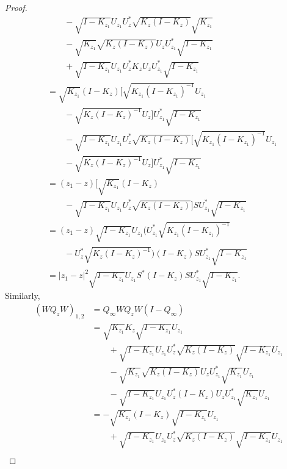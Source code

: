 \documentclass{amsart}
\begin{document}
\begin{proof}
\begin{equation}
\begin{split}
                    & \qquad - \sqrt{I - K_{z_1}}U_{z_1}U^{*}_{z}\sqrt{K_{z} (I - K_{z})}\sqrt{K_{z_1}} \\
                    & \qquad - \sqrt{K_{z_1}}\sqrt{K_{z}(I-K_{z})}U_{z}U^{*}_{z_1}\sqrt{I-K_{z_1}} \\
                    & \qquad + \sqrt{I-K_{z_1}}U_{z_1}U^{*}_{z}K_{z}U_{z}U^{*}_{z_1}\sqrt{I - K_{z_1}}\\
                    &= \sqrt{K_{z_1}}(I-K_z)[\sqrt{K_{z_1}(I-K_{z_1})^{-1}}U_{z_1} \\
                    & \qquad - \sqrt{K_z(I - K_z)^{-1}}U_z]U_{z_1}^{*}\sqrt{I-K_{z_1}} \\
                    & \qquad- \sqrt{I-K_{z_1}}U_{z_1}U_{z}^{*}\sqrt{K_{z}(I- K_z)}[\sqrt{K_{z_1}(I-K_{z_1})^{-1}}U_{z_1}\\
                    & \qquad  - \sqrt{K_z(I - K_z)^{-1}}U_z]U^{*}_{z_1}\sqrt{I-K_{z_1}}\\
                    & = (z_1 - z)[\sqrt{K_{z_1}}(I-K_z)\\
                    & \qquad -\sqrt{I - K_{z_1}}U_{z_1}U^{*}_{z}\sqrt{K_{z}(I-K_z)}]SU_{z_1}^{*}\sqrt{I-K_{z_1}}\\
                    &= (z_1 - z)\sqrt{I-K_{z_1}}U_{z_1}(U^{*}_{z_1}\sqrt{K_{z_1}(I-K_{z_1})^{-1}}\\
                    & \qquad  - U^{*}_{z}\sqrt{K_z(I-K_z)^{-1}})(I-K_z)SU^{*}_{z_1}\sqrt{I-K_{z_1}}\\
                    &= |z_1 - z|^{2}\sqrt{I-K_{z_1}}U_{z_1}S^{*}(I-K_z)SU_{z_1}^{*}\sqrt{I-K_{z_1}}.
\end{split}
\end{equation}
Similarly,
\begin{align*}\label{eq6}
(WQ_{z}W)_{1,2} &= Q_{\infty}WQ_{z}W(I - Q_{\infty}) \\   
                &= \sqrt{K_{z_1}}K_{z}\sqrt{I - K_{z_1}}U_{z_1} \\
                & \qquad + \sqrt{I - K_{z_1}}U_{z_1}U^{*}_{z}\sqrt{K_{z} (I - K_{z})}\sqrt{I - K_{z_1}}U_{z_1} \\
                & \qquad -\sqrt{K_{z_1}}\sqrt{K_{z}(I-K_{z})}U_{z}U^{*}_{z_1}\sqrt{K_{z_1}}U_{z_1}\\
                & \qquad  - \sqrt{I-K_{z_1}}U_{z_1}U^{*}_{z}(I - K_z)U_{z}U^{*}_{z_1}\sqrt{K_{z_1}}U_{z_1}\\
                &= -\sqrt{K_{z_1}}(I-K_{z})\sqrt{I - K_{z_1}}U_{z_1} \\
                & \qquad + \sqrt{I - K_{z_1}}U_{z_1}U^{*}_{z}\sqrt{K_{z} (I - K_{z})}\sqrt{I - K_{z_1}}U_{z_1} \\

\end{align*}
\end{proof}
\end{document}
